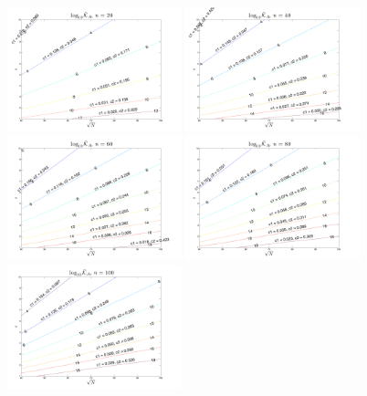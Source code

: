\documentclass[11pt]{report}
\begin{document}
{\begin{figure}[htbp]
\centering
\includegraphics[width=0.45\textwidth]{../figures/chapter2/epsilon_contours/labeled_contour_n20.pdf}
\includegraphics[width=0.45\textwidth]{../figures/chapter2/epsilon_contours/labeled_contour_n40.pdf}
\includegraphics[width=0.45\textwidth]{../figures/chapter2/epsilon_contours/labeled_contour_n60.pdf}
\includegraphics[width=0.45\textwidth]{../figures/chapter2/epsilon_contours/labeled_contour_n80.pdf}
\includegraphics[width=0.45\textwidth]{../figures/chapter2/epsilon_contours/labeled_contour_n100.pdf}

\end{figure}}
\end{document}
